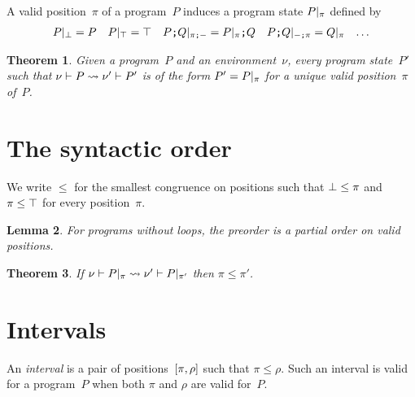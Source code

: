 \documentclass[a4paper]{article}
\theoremstyle{theorem}
\newtheorem{theorem}{Theorem}
\newtheorem{lemma}[theorem]{Lemma}
\theoremstyle{remark}
\newtheorem{remark}[theorem]{Remark}
\begin{document}




A valid position~$\pi$ of a program~$P$ induces a program state $\postate\pi P$
defined by
\begin{align*}
  \postate\pbot P&=P
  &
  \postate\ptop P&=\pskip
  &
  \postate{\pseql\pi}{\pseq PQ}&=\pseq{\postate\pi P}Q
  &
  \postate{\pseqr\pi}{\pseq PQ}&=\postate\pi Q
  &
  \ldots
\end{align*}

\begin{theorem}
  Given a program~$P$ and an environment~$\nu$, every program state~$P'$ such
  that $\penv\nu P\redto\penv{\nu'}{P'}$ is of the form $P'=\postate\pi P$ for a
  unique valid position~$\pi$ of~$P$.
\end{theorem}

\section{The syntactic order}
We write $\leq$ for the smallest congruence on positions such that
$\pbot\leq\pi$ and $\pi\leq\ptop$ for every position~$\pi$.

\begin{lemma}
  For programs without loops, the preorder is a partial order on valid
  positions.
\end{lemma}

\begin{theorem}
  If $\penv\nu{\postate\pi P}\redto\penv{\nu'}{\postate{\pi'}P}$ then
  $\pi\leq\pi'$.
\end{theorem}

\section{Intervals}
 An \emph{interval}
is a pair of positions~$\intv\pi\rho$ such that $\pi\leq\rho$. Such an interval
is valid for a program~$P$ when both $\pi$ and $\rho$ are valid for~$P$.
\end{document}
